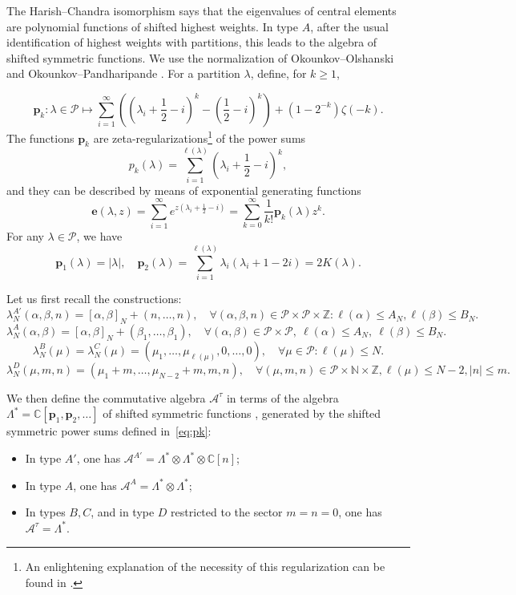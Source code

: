 \documentclass[11pt,a4paper,reqno]{article}
\theoremstyle{definition}
\theoremstyle{remark}
\newcommand\Z{{\mathbb Z}}
\newcommand\N{{\mathbb N}}
\newcommand\C{\mathbb{C}}
\newcommand\Pfr{\mathscr{P}}
\begin{document}
The Harish--Chandra isomorphism says that the eigenvalues of central elements are polynomial functions of shifted highest weights. In type $A$, after the usual identification of highest weights with partitions, this leads to the algebra of shifted symmetric functions. We use the normalization of Okounkov--Olshanski \cite{OO97,OO98} and Okounkov--Pandharipande \cite[Section~0.4.3]{OP2}. For a partition $\lambda$, define, for $k\geq 1$,

\begin{equation}\label{eq:pk}
\mathbf{p}_k:\lambda\in\Pfr\mapsto\sum_{i=1}^\infty\left((\lambda_i+\frac12-i)^k-(\frac12-i)^k\right)+(1-2^{-k})\zeta(-k).
\end{equation}
The functions $\mathbf{p}_k$ are zeta-regularizations\footnote{An enlightening explanation of the necessity of this regularization can be found in \cite[\S 0.4.3]{OP2}.} of the power sums
\[
p_k(\lambda)=\sum_{i=1}^{\ell(\lambda)}\left(\lambda_i+\frac12-i\right)^k,
\]
and they can be described by means of exponential generating functions
\begin{equation}\label{eq:exp_pk}
\mathbf{e}(\lambda,z)=\sum_{i=1}^\infty e^{z(\lambda_i+\frac12-i)} =\sum_{k=0}^\infty\frac{1}{k!}\mathbf{p}_k(\lambda)z^k.
\end{equation}
For any $\lambda\in\Pfr$, we have
\begin{equation}\label{eq:p_1p_2}
\mathbf{p}_1(\lambda)=\vert\lambda\vert,\quad \mathbf{p}_2(\lambda)=\sum_{i=1}^{\ell(\lambda)}\lambda_i(\lambda_i+1-2i)=2K(\lambda).
\end{equation}

Let us first recall the constructions:
\[
\lambda_N^{A'}(\alpha,\beta,n)=[\alpha,\beta]_N+(n,\ldots,n),\quad \forall (\alpha,\beta,n)\in\Pfr\times\Pfr\times\Z: \ell(\alpha)\leq A_N,\ell(\beta)\leq B_N.
\]
\[
\lambda_N^A(\alpha,\beta)=[\alpha,\beta]_N+(\beta_1,\ldots,\beta_1),\quad \forall (\alpha,\beta)\in\Pfr\times\Pfr,\ \ell(\alpha)\leq A_N,\ \ell(\beta)\leq B_N.
\]
\[
\lambda_N^B(\mu)=\lambda_N^C(\mu)=(\mu_1,\ldots,\mu_{\ell(\mu)},0,\ldots,0),\quad \forall \mu\in\Pfr:\ell(\mu)\leq N.
\]
\[
\lambda_N^D(\mu,m,n)=(\mu_1+m,\ldots,\mu_{N-2}+m,m,n),\quad \forall (\mu,m,n)\in\Pfr\times\N\times\Z, \ell(\mu)\leq N-2,\vert n\vert\leq m.
\]

We then define the commutative algebra $\mathcal{A}^\tau$ in terms of the algebra $\Lambda^*=\C[\mathbf{p}_1,\mathbf{p}_2,\ldots]$ of shifted symmetric functions \cite{OO97,OO98}, generated by the shifted symmetric power sums defined in~\eqref{eq:pk}:
\begin{itemize}
\item In type $A'$, one has $\mathcal A^{A'}=\Lambda^*\otimes \Lambda^*\otimes \C[n]$;
\item In type $A$, one has $\mathcal A^{A}=\Lambda^*\otimes \Lambda^*$;
\item In types $B,C$, and in type $D$ restricted to the sector $m=n=0$, one has $\mathcal A^\tau=\Lambda^*$.\\
\end{itemize}
\end{document}
